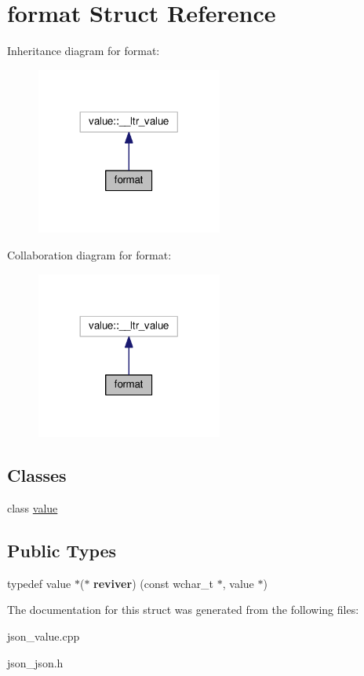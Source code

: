 \hypertarget{structformat}{}\section{format Struct Reference}
\label{structformat}


Inheritance diagram for format\+:
\nopagebreak
\begin{figure}[H]
\begin{center}
\leavevmode
\includegraphics[width=173pt]{structformat__inherit__graph}
\end{center}
\end{figure}


Collaboration diagram for format\+:
\nopagebreak
\begin{figure}[H]
\begin{center}
\leavevmode
\includegraphics[width=173pt]{structformat__coll__graph}
\end{center}
\end{figure}
\subsection*{Classes}
\begin{DoxyCompactItemize}
\item 
class \hyperlink{classformat_1_1value}{value}
\end{DoxyCompactItemize}
\subsection*{Public Types}
\begin{DoxyCompactItemize}
\item 
typedef value $\ast$($\ast$ {\bfseries reviver}) (const wchar\+\_\+t $\ast$, value $\ast$)\hypertarget{structformat_a8b8bca9d689121d31347a4d47f79e61f}{}\label{structformat_a8b8bca9d689121d31347a4d47f79e61f}

\end{DoxyCompactItemize}


The documentation for this struct was generated from the following files\+:\begin{DoxyCompactItemize}
\item 
json\+\_\+value.\+cpp\item 
json\+\_\+json.\+h\end{DoxyCompactItemize}
